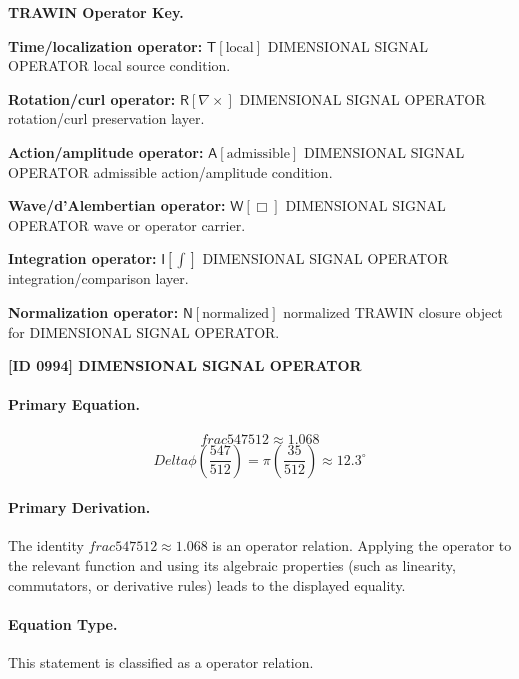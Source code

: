 \par\vspace{0.45\baselineskip}
\noindent\begin{minipage}[t]{\linewidth}
\begingroup
\small
\raggedright
\textbf{TRAWIN Operator Key.}\par
\noindent\textbf{Time/localization operator:} $\mathsf{T}\!\left[\mathrm{local}\right]$ DIMENSIONAL SIGNAL OPERATOR local source condition.\par
\noindent\textbf{Rotation/curl operator:} $\mathsf{R}\!\left[\nabla\times\right]$ DIMENSIONAL SIGNAL OPERATOR rotation/curl preservation layer.\par
\noindent\textbf{Action/amplitude operator:} $\mathsf{A}\!\left[\mathrm{admissible}\right]$ DIMENSIONAL SIGNAL OPERATOR admissible action/amplitude condition.\par
\noindent\textbf{Wave/d'Alembertian operator:} $\mathsf{W}\!\left[\Box\right]$ DIMENSIONAL SIGNAL OPERATOR wave or operator carrier.\par
\noindent\textbf{Integration operator:} $\mathsf{I}\!\left[\int\right]$ DIMENSIONAL SIGNAL OPERATOR integration/comparison layer.\par
\noindent\textbf{Normalization operator:} $\mathsf{N}\!\left[\mathrm{normalized}\right]$ normalized TRAWIN closure object for DIMENSIONAL SIGNAL OPERATOR.\par
\endgroup
\end{minipage}

\clearpage
\noindent\textbf{[ID 0994] DIMENSIONAL SIGNAL OPERATOR}\par
\vspace{0.35em}
\paragraph{Primary Equation.}
\[
frac{547}{512} \approx 1.068
\]
\[
Delta\phi\left(\frac{547}{512}\right) = \pi\left(\frac{35}{512}\right) \approx 12.3^\circ
\]

\paragraph{Primary Derivation.}
The identity \( frac{547}{512} \approx 1.068 \) is an operator relation. Applying the operator to the relevant function and using its algebraic properties (such as linearity, commutators, or derivative rules) leads to the displayed equality.
\paragraph{Equation Type.}
This statement is classified as a operator relation.

